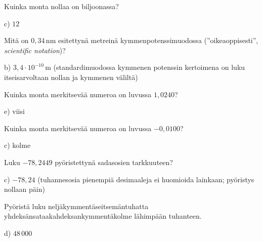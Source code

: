 \begin{multicols}{2}
\begin{tehtava}
Kuinka monta nollaa on biljoonassa?
\begin{vastaus}
c) $12$
\end{vastaus}
\end{tehtava}

\begin{tehtava}
Mitä on $0,34$\,nm esitettynä metreinä kymmenpotenssimuodossa (''oikeaoppisesti'', \textit{scientific notation})?
\begin{vastaus}
b) $3,4 \cdot 10^{-10}$\,m (standardimuodossa kymmenen potenssin kertoimena on luku itseisarvoltaan nollan ja kymmenen väliltä)
\end{vastaus}
\end{tehtava}

\begin{tehtava}
Kuinka monta merkitsevää numeroa on luvussa $1,0240$?
\begin{vastaus}
e) viisi
\end{vastaus}
\end{tehtava}

\begin{tehtava}
Kuinka monta merkitsevää numeroa on luvussa $-0,0100$?
\begin{vastaus}
c) kolme
\end{vastaus}
\end{tehtava}

\begin{tehtava}
Luku $-78,2449$ pyöristettynä sadasosien tarkkuuteen?
\begin{vastaus}
c) $-78,24$ (tuhannesosia pienempiä desimaaleja ei huomioida lainkaan; pyöristys nollaan päin)
\end{vastaus}
\end{tehtava}

\begin{tehtava}
Pyöristä luku neljäkymmentäseitsemäntuhatta yhdeksänsataakahdeksankymmentäkolme lähimpään tuhanteen.
\begin{vastaus}
d) $48\,000$
\end{vastaus}
\end{tehtava}


\end{multicols}
